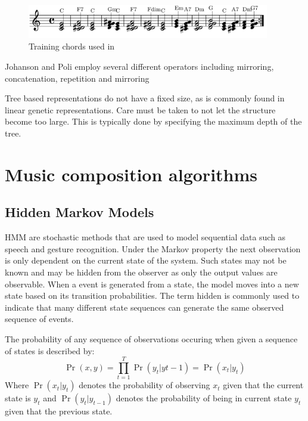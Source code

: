 \begin{figure}
\centerline{\includegraphics[width=400px]{../images/eck_chords_training.png}}
\caption{Training chords used in \cite{Eck2002}}
\label{ims:eckchords}
\end{figure}

Johanson and Poli employ several different operators including mirroring, concatenation, repetition and mirroring \cite{Johanson1998}

Tree based representations do not have a fixed size, as is commonly found in linear genetic representations. Care must be taken to not let the structure become too large. This is typically done by specifying the maximum depth of the tree.


\chapter{Music composition algorithms} \label{chap:comp_algo}

\section{Hidden Markov Models} \label{sec:hmm_backround}
\ac{HMM} are stochastic methods that are used to model sequential data such as speech and gesture recognition.
Under the Markov property the next observation is only dependent on the current state of the system. Such states may not be known and may be hidden from the observer as only the output values are observable. When a event is generated from a state, the model moves into a new state based on its transition probabilities. The term hidden is commonly used to indicate that many different state sequences can generate the same observed sequence of events.

The probability of any sequence of observations occuring when given a sequence of states is described by:
\[\Pr(x,y) = \prod^T_{t=1} \Pr(y_t | y{t-1}) = \Pr(x_t | y_t) \]
Where $\Pr(x_t|y_t)$ denotes the probability of observing $x_t$ given that the current state is $y_t$ and $\Pr(y_t|y_{t-1})$ denotes the probability of being in current state $y_t$ given that the previous state.

